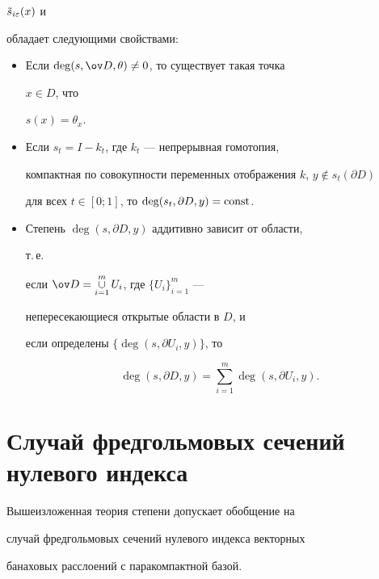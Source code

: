 $\Tilde s_{i\varepsilon}(x)$ и 


обладает следующими свойствами:


\begin{itemize} 


\item[1.] Если $\deg(s,\ov D,\theta)\ne0$, то существует такая точка 


$x\in D$, что 


$s(x)=\theta_x$. 


\item[2.] Если $s_t=I-k_t$, где $k_t$ --- непрерывная гомотопия, 


компактная по совокупности переменных отображения $k$, $y\notin 


s_t(\partial D)$ 


для всех $t\in[0;1]$, то $\deg(s_t,\partial D,y)=\operatorname{const}$. 


\item[3.] Степень $\deg(s,\partial D,y)$ аддитивно зависит от области, 


т.\,е. 


если $\ov D=\mathop{\cup}\limits^m_{i=1}U_i$, где $\{U_i\}^m_{i=1}$ --- 


непересекающиеся открытые области в $D$, и 


если определены $\{\deg(s,\partial U_i,y)\}$, то


$$


\deg(s,\partial 


D,y)=\sum\limits^m_{i=1}\deg(s,\partial U_i,y). 


$$


\end{itemize} 


 


 


\section{Случай фредгольмовых сечений нулевого индекса} 


 


Вышеизложенная теория степени допускает обобщение на 


случай фредгольмовых сечений нулевого индекса векторных 


банаховых расслоений с паракомпактной базой. 


 


